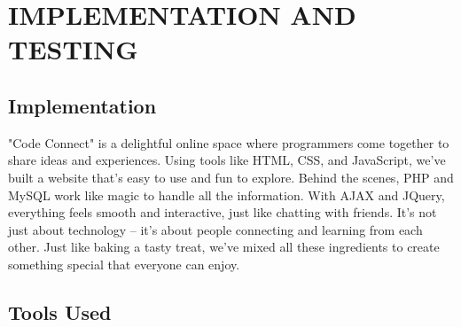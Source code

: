 \chapter{IMPLEMENTATION AND TESTING}
\section{Implementation}
"Code Connect" is a delightful online space where programmers come together to share ideas and experiences. Using tools like HTML, CSS, and JavaScript, we've built a website that's easy to use and fun to explore. Behind the scenes, PHP and MySQL work like magic to handle all the information. With AJAX and JQuery, everything feels smooth and interactive, just like chatting with friends. It's not just about technology – it's about people connecting and learning from each other. Just like baking a tasty treat, we've mixed all these ingredients to create something special that everyone can enjoy.





\section{Tools Used}

